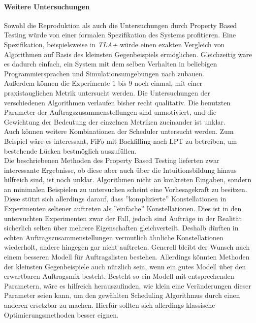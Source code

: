 \paragraph{Weitere Untersuchungen}
Sowohl die Reproduktion als auch die Untersuchungen durch Property Based Testing würde von einer formalen Spezifikation des Systems profitieren. Eine Spezifikation, beispielsweise in \emph{TLA+} würde einen exakten Vergleich von Algorithmen auf Basis des kleinsten Gegenbeispiels ermöglichen. Gleichzeitig wäre es dadurch einfach, ein System mit dem selben Verhalten in beliebigen Programmiersprachen und Simulationsumgebungen nach zubauen.\\
Außerdem können die Experimente 1 bis 9 noch einmal, mit einer praxistauglichen Metrik untersucht werden. Die Untersuchungen der verschiedenen Algorithmen verlaufen bisher recht qualitativ. Die benutzten Parameter der Auftragszusammenstellungen sind unmotiviert, und die Gewichtung der Bedeutung der einzelnen Metriken zueinander ist unklar.\\
Auch können weitere Kombinationen der Scheduler untersucht werden. Zum Beispiel wäre es interessant, FiFo mit Backfilling nach LPT zu betreiben, um bestehende Lücken bestmöglich auszufüllen.\\
Die beschriebenen Methoden des Property Based Testing lieferten zwar interessante Ergebnisse, ob diese aber auch über die Intuitionsbildung hinaus hilfreich sind, ist noch unklar. Algorithmen nicht an konkreten Eingaben, sondern an minimalen Beispielen zu untersuchen scheint eine Vorhesagekraft zu besitzen. Diese stützt sich allerdings darauf, dass ''komplizierte'' Konstellationen in Experimenten seltener auftreten als ''einfache'' Konstellationen. Dies ist in den untersuchten Experimenten zwar der Fall, jedoch sind Aufträge in der Realität sicherlich selten über mehrere Eigenschaften gleichverteilt. Deshalb dürften in echten Auftragszusammenstellungen vermutlich ähnliche Konstellationen wiederholt, andere hingegen gar nicht auftreten. Generell bleibt der Wunsch nach einem besseren Modell für Auftragslisten bestehen. Allerdings könnten  Methoden der kleinsten Gegenbeispiele auch nützlich sein, wenn ein gutes Modell über den erwartbaren Auftragsmix besteht. Besteht so ein Modell mit entsprechenden Parametern, wäre es hilfreich herauszufinden, wie klein eine Veränderungen dieser Parameter seien kann, um den gewählten Scheduling Algorithmus durch einen anderen ersetzbar zu machen. Hierfür sollten sich allerdings klassische Optimierungsmethoden besser eignen. 